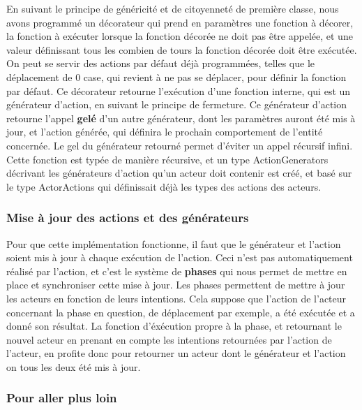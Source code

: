 \documentclass{article}
\begin{document}
En suivant le principe de généricité et de citoyenneté de première classe, nous avons programmé un décorateur qui prend en paramètres une fonction à décorer, la fonction à exécuter lorsque la fonction décorée ne doit pas être appelée, et une valeur définissant tous les combien de tours la fonction décorée doit être exécutée. On peut se servir des actions par défaut déjà programmées, telles que le déplacement de 0 case, qui revient à ne pas se déplacer, pour définir la fonction par défaut.
Ce décorateur retourne l'exécution d'une fonction interne, qui est un générateur d'action, en suivant le principe de fermeture. Ce générateur d'action retourne l'appel \textbf{gelé} d'un autre générateur, dont les paramètres auront été mis à jour, et l'action générée, qui définira le prochain comportement de l'entité concernée. Le gel du générateur retourné permet d'éviter un appel récursif infini. Cette fonction est typée de manière récursive, et un type ActionGenerators décrivant les générateurs d'action qu'un acteur doit contenir est créé, et basé sur le type ActorActions qui définissait déjà les types des actions des acteurs.

\subsubsection{Mise à jour des actions et des générateurs}

Pour que cette implémentation fonctionne, il faut que le générateur et l'action soient mis à jour à chaque exécution de l'action. Ceci n'est pas automatiquement réalisé par l'action, et c'est le système de \textbf{phases} qui nous permet de mettre en place et synchroniser cette mise à jour.
Les phases permettent de mettre à jour les acteurs en fonction de leurs intentions. Cela suppose que l'action de l'acteur concernant la phase en question, de déplacement par exemple, a été exécutée et a donné son résultat. La fonction d'éxécution propre à la phase, et retournant le nouvel acteur en prenant en compte les intentions retournées par l'action de l'acteur, en profite donc pour retourner un acteur dont le générateur et l'action on tous les deux été mis à jour.

\subsubsection{Pour aller plus loin}
\end{document}
